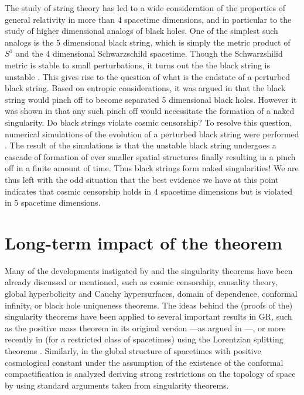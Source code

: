 \documentclass[12pt]{iopart}
\begin{document}
The study of string theory has led to a wide consideration of the properties of general relativity in more than 4 spacetime dimensions, and in particular to the study of higher dimensional analogs of black holes.  One of the simplest such analogs is the 5 dimensional black string, which is simply the metric product of $S^1$ and the 4 dimensional Schwarzschild spacetime.  Though the Schwarzshilid metric is stable to small perturbations, it turns out the the black string is unstable \cite{GlF}.
This gives rise to the question of what is the endstate of a perturbed black string.  Based on entropic considerations, it was argued in \cite{GlF} that the black string would pinch off to become separated 5 dimensional black holes.  However it was shown in \cite{HorMae} that any such pinch off would necessitate the formation of a naked singularity.  Do black strings violate cosmic censorship?  To resolve this question, numerical simulations of the evolution of a perturbed black string were performed \cite{BS1,BS2}. The result of the simulations is that the unstable black string undergoes a cascade of formation of ever smaller spatial structures finally resulting in a pinch off in a finite amount of time.  Thus black strings form naked singularities!  We are thus left with the odd situation that the best evidence we have at this point indicates that cosmic censorship holds in 4 spacetime dimensions but is violated in 5 spacetime dimensions.  





\section{Long-term impact of the theorem}\label{sec:legacy}
Many of the developments instigated by \cite{P} and the singularity theorems have been already discussed or mentioned, such as cosmic censorship, causality theory,  global hyperbolicity and Cauchy hypersurfaces, domain of dependence, conformal infinity, or black hole uniqueness theorems. The ideas behind the (proofs of the) singularity theorems have been applied to several important results in GR, such as the positive mass theorem in its original version \cite{SY1,SY2} ---as argued in \cite{Horo}---, or more recently in \cite{ChGa} (for a restricted class of spacetimes) using the Lorentzian splitting theorems \cite{Galloway}. Similarly, in \cite{AnG} the global structure of spacetimes with positive cosmological constant under the assumption of the existence of the conformal compactification is analyzed deriving strong restrictions on the topology of space by using standard arguments taken from singularity theorems.  
\end{document}
